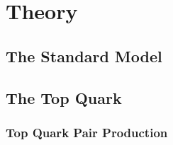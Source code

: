 
\chapter{Theory}

\section{The Standard Model}

\section{The Top Quark}

\subsection{Top Quark Pair Production}

